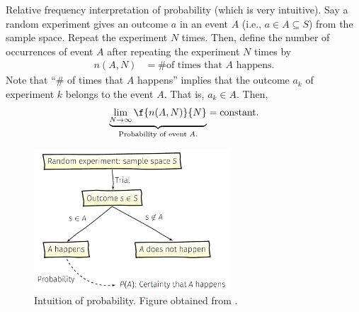 \begin{example}
    Relative frequency interpretation of probability (which is very intuitive).
    Say a random experiment gives an outcome $a$ in an event $A$ (i.e., $a\in A\subseteq S$) from the sample space. Repeat the experiment $N$ times. Then, define the number of occurrences of event $A$ after repeating the experiment $N$ times by
    \begin{align}
        n(A,N) &= \text{\# of times that $A$ happens}.
    \end{align}
    Note that ``\# of times that $A$ happens'' implies that the outcome $a_{k}$ of experiment $k$ belongs to the event $A$. That is, $a_{k}\in A$.
    Then, 
    \begin{align}
        \underbrace{\lim_{N\rightarrow\infty} \f{n(A,N)}{N}}_{\text{Probability of event $A$.}} = \text{constant}.
    \end{align}
    \triqed
\end{example}

\begin{figure}[h]
    \centering
    \includegraphics[width=0.65\textwidth]{figs/1_review_prob_intuition.PNG}
    \caption{Intuition of probability. Figure obtained from \cite{psaromiligkos_slides_2019}.}
    \label{fig:prob. intuition}
\end{figure}

